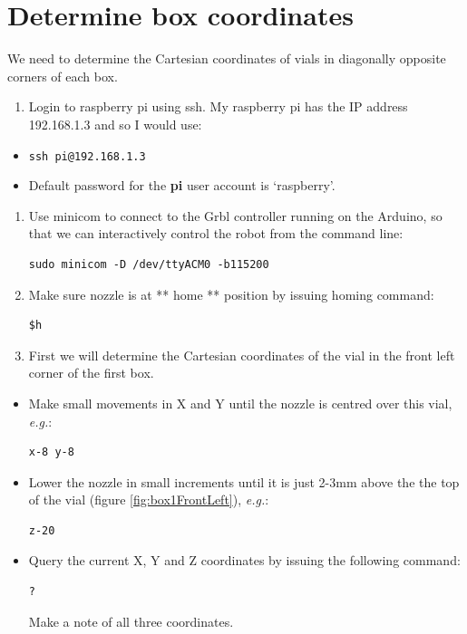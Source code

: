 \documentclass[]{book}
\providecommand{\tightlist}{%
  \setlength{\itemsep}{0pt}\setlength{\parskip}{0pt}}
\theoremstyle{definition}
\theoremstyle{definition}
\theoremstyle{definition}
\theoremstyle{remark}
\begin{document}
\section{Determine box coordinates}\label{boxCoordinates}

We need to determine the Cartesian coordinates of vials in diagonally
opposite corners of each box.

\begin{enumerate}
\def\labelenumi{\arabic{enumi}.}
\tightlist
\item
  Login to raspberry pi using ssh. My raspberry pi has the IP address
  192.168.1.3 and so I would use:
\end{enumerate}

\begin{itemize}
\tightlist
\item
  \texttt{ssh\ pi@192.168.1.3}
\item
  Default password for the \textbf{pi} user account is `raspberry'.
\end{itemize}

\begin{enumerate}
\def\labelenumi{\arabic{enumi}.}
\setcounter{enumi}{1}
\item
  Use minicom to connect to the Grbl controller running on the Arduino,
  so that we can interactively control the robot from the command line:

\begin{verbatim}
sudo minicom -D /dev/ttyACM0 -b115200
\end{verbatim}
\item
  Make sure nozzle is at ** home ** position by issuing homing command:

\begin{verbatim}
$h
\end{verbatim}
\item
  First we will determine the Cartesian coordinates of the vial in the
  front left corner of the first box.
\end{enumerate}

\begin{itemize}
\item
  Make small movements in X and Y until the nozzle is centred over this
  vial, \emph{e.g.}:

\begin{verbatim}
x-8 y-8
\end{verbatim}
\item
  Lower the nozzle in small increments until it is just 2-3mm above the
  the top of the vial (figure \ref{fig:box1FrontLeft}), \emph{e.g.}:

\begin{verbatim}
z-20
\end{verbatim}
\item
  Query the current X, Y and Z coordinates by issuing the following
  command:

\begin{verbatim}
?
\end{verbatim}

  Make a note of all three coordinates.
\end{itemize}
\end{document}
